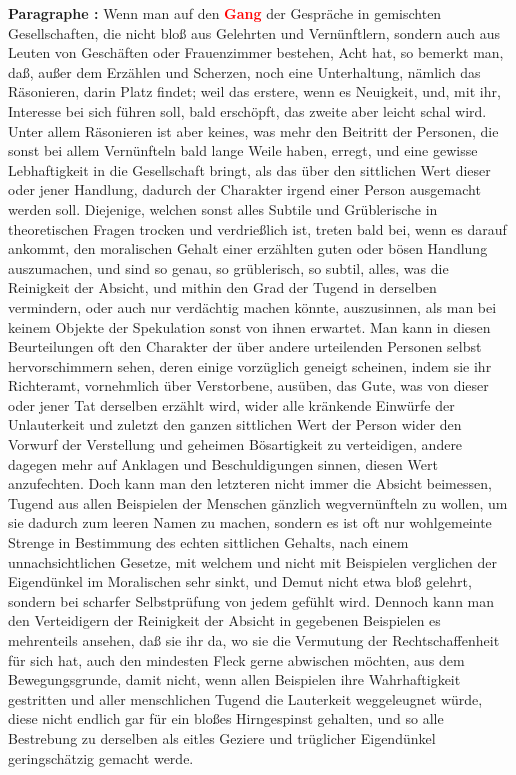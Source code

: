 \documentclass[a4paper,12pt,twoside]{book}
\newcommand{\match}[1]{\textcolor{red}{\textbf{#1}}}
\begin{document}
	\textbf{Paragraphe : }Wenn man auf den \match{Gang} der Gespräche in gemischten Gesellschaften, die nicht bloß aus Gelehrten und Vernünftlern, sondern auch aus Leuten von Geschäften oder Frauenzimmer bestehen, Acht hat, so bemerkt man, daß, außer dem Erzählen und Scherzen, noch eine Unterhaltung, nämlich das Räsonieren, darin Platz findet; weil das erstere, wenn es Neuigkeit, und, mit ihr, Interesse bei sich führen soll, bald erschöpft, das zweite aber leicht schal wird. Unter allem Räsonieren ist aber keines, was mehr den Beitritt der Personen, die sonst bei allem Vernünfteln bald lange Weile haben, erregt, und eine gewisse Lebhaftigkeit in die Gesellschaft bringt, als das über den sittlichen Wert dieser oder jener Handlung, dadurch der Charakter irgend einer Person ausgemacht werden soll. Diejenige, welchen sonst alles Subtile und Grüblerische in theoretischen Fragen trocken und verdrießlich ist, treten bald bei, wenn es darauf ankommt, den moralischen Gehalt einer erzählten guten oder bösen Handlung auszumachen, und sind so genau, so grüblerisch, so subtil, alles, was die Reinigkeit der Absicht, und mithin  den Grad der Tugend in derselben vermindern, oder auch nur verdächtig machen könnte, auszusinnen, als man bei keinem Objekte der Spekulation sonst von ihnen erwartet. Man kann in diesen Beurteilungen oft den Charakter der über andere urteilenden Personen selbst hervorschimmern sehen, deren einige vorzüglich geneigt scheinen, indem sie ihr Richteramt, vornehmlich über Verstorbene, ausüben, das Gute, was von dieser oder jener Tat derselben erzählt wird, wider alle kränkende Einwürfe der Unlauterkeit und zuletzt den ganzen sittlichen Wert der Person wider den Vorwurf der Verstellung und geheimen Bösartigkeit zu verteidigen, andere dagegen mehr auf Anklagen und Beschuldigungen sinnen, diesen Wert anzufechten. Doch kann man den letzteren nicht immer die Absicht beimessen, Tugend aus allen Beispielen der Menschen gänzlich wegvernünfteln zu wollen, um sie dadurch zum leeren Namen zu machen, sondern es ist oft nur wohlgemeinte Strenge in Bestimmung des echten sittlichen Gehalts, nach einem unnachsichtlichen Gesetze, mit welchem und nicht mit Beispielen verglichen der Eigendünkel im Moralischen sehr sinkt, und Demut nicht etwa bloß gelehrt, sondern bei scharfer Selbstprüfung von jedem gefühlt wird. Dennoch kann man den Verteidigern der Reinigkeit der Absicht in gegebenen Beispielen es mehrenteils ansehen, daß sie ihr da, wo sie die Vermutung der Rechtschaffenheit für sich hat, auch den mindesten Fleck gerne abwischen möchten, aus dem Bewegungsgrunde, damit nicht, wenn allen Beispielen ihre Wahrhaftigkeit gestritten und aller menschlichen Tugend die Lauterkeit weggeleugnet würde, diese nicht endlich gar für ein bloßes Hirngespinst gehalten, und so alle Bestrebung zu derselben als eitles Geziere und trüglicher Eigendünkel geringschätzig gemacht werde. 
	
\end{document}
